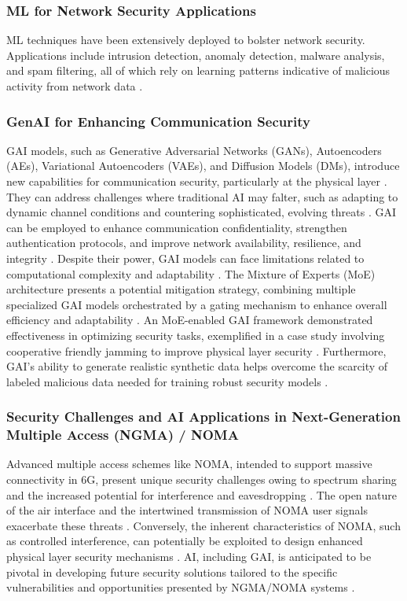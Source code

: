 \documentclass[sigconf]{acmart}
\begin{document}
\subsubsection{ML for Network Security Applications}\label{subsubsec:ml_security}
ML techniques have been extensively deployed to bolster network security. Applications include intrusion detection, anomaly detection, malware analysis, and spam filtering, all of which rely on learning patterns indicative of malicious activity from network data \cite{ref12}.

\subsubsection{GenAI for Enhancing Communication Security}\label{subsubsec:genai_security}
GAI models, such as Generative Adversarial Networks (GANs), Autoencoders (AEs), Variational Autoencoders (VAEs), and Diffusion Models (DMs), introduce new capabilities for communication security, particularly at the physical layer \cite{ref5, ref20}. They can address challenges where traditional AI may falter, such as adapting to dynamic channel conditions and countering sophisticated, evolving threats \cite{ref5, ref20}. GAI can be employed to enhance communication confidentiality, strengthen authentication protocols, and improve network availability, resilience, and integrity \cite{ref5}. Despite their power, GAI models can face limitations related to computational complexity and adaptability \cite{ref20}. The Mixture of Experts (MoE) architecture presents a potential mitigation strategy, combining multiple specialized GAI models orchestrated by a gating mechanism to enhance overall efficiency and adaptability \cite{ref20}. An MoE-enabled GAI framework demonstrated effectiveness in optimizing security tasks, exemplified in a case study involving cooperative friendly jamming to improve physical layer security \cite{ref20}. Furthermore, GAI's ability to generate realistic synthetic data helps overcome the scarcity of labeled malicious data needed for training robust security models \cite{ref5, ref26}.

\subsubsection{Security Challenges and AI Applications in Next-Generation Multiple Access (NGMA) / NOMA} \label{subsubsec:noma_security}
Advanced multiple access schemes like NOMA, intended to support massive connectivity in 6G, present unique security challenges owing to spectrum sharing and the increased potential for interference and eavesdropping \cite{ref30}. The open nature of the air interface and the intertwined transmission of NOMA user signals exacerbate these threats \cite{ref30}. Conversely, the inherent characteristics of NOMA, such as controlled interference, can potentially be exploited to design enhanced physical layer security mechanisms \cite{ref30}. AI, including GAI, is anticipated to be pivotal in developing future security solutions tailored to the specific vulnerabilities and opportunities presented by NGMA/NOMA systems \cite{ref30}.
\end{document}
